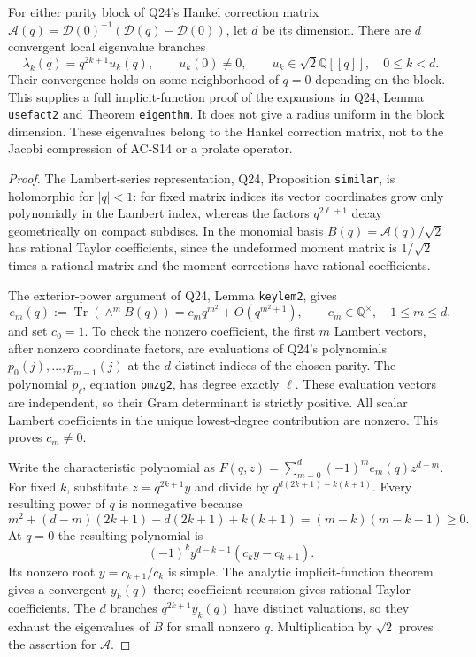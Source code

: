 \begin{proposition}
\label{AC-S20}
For either parity block of Q24's Hankel correction matrix
\(\mathcal A(q)=\mathcal D(0)^{-1}
                         (\mathcal D(q)-\mathcal D(0))\),
let \(d\) be its dimension.  There are \(d\) convergent local
eigenvalue branches
\[
 \lambda_k(q)=q^{2k+1}u_k(q),\qquad
 u_k(0)\ne0,\qquad
 u_k\in\sqrt2\mathbb Q[[q]],\quad0\leq k<d.
\]
Their convergence holds on some neighborhood of \(q=0\) depending
on the block.  This supplies a full implicit-function proof of the
expansions in Q24, Lemma \texttt{usefact2} and Theorem
\texttt{eigenthm}.  It does not give a radius uniform in the block
dimension.  These eigenvalues belong to the Hankel correction matrix,
not to the Jacobi compression of AC-S14 or a prolate operator.
\end{proposition}
\begin{proof}
The Lambert-series representation, Q24, Proposition
\texttt{similar}, is holomorphic for \(|q|<1\): for fixed matrix
indices its vector coordinates grow only polynomially in the
Lambert index, whereas the factors \(q^{2\ell+1}\) decay
geometrically on compact subdiscs.  In the monomial basis
\(B(q)=\mathcal A(q)/\sqrt2\) has rational Taylor coefficients,
since the undeformed moment matrix is \(1/\sqrt2\) times a
rational matrix and the moment corrections have rational
coefficients.

The exterior-power argument of Q24, Lemma \texttt{keylem2}, gives
\[
 e_m(q):=\operatorname{Tr}(\wedge^mB(q))
       =c_mq^{m^2}+O(q^{m^2+1}),\qquad c_m\in\mathbb Q^\times,
       \quad1\leq m\leq d,
\]
and set \(c_0=1\).  To check the nonzero coefficient, the first
\(m\) Lambert vectors, after nonzero coordinate factors, are
evaluations of Q24's polynomials \(p_0(j),\ldots,p_{m-1}(j)\)
at the \(d\) distinct indices of the chosen parity.  The polynomial
\(p_\ell\), equation \texttt{pmzg2}, has degree exactly \(\ell\).
These evaluation vectors are independent, so their Gram determinant
is strictly positive.  All scalar Lambert coefficients in the unique
lowest-degree contribution are nonzero.  This proves \(c_m\ne0\).

Write the characteristic polynomial as
\(F(q,z)=\sum_{m=0}^d(-1)^me_m(q)z^{d-m}\).
For fixed \(k\), substitute \(z=q^{2k+1}y\) and divide by
\(q^{d(2k+1)-k(k+1)}\).  Every resulting power of \(q\) is
nonnegative because
\[
 m^2+(d-m)(2k+1)-d(2k+1)+k(k+1)
       =(m-k)(m-k-1)\geq0.
\]
At \(q=0\) the resulting polynomial is
\[
 (-1)^ky^{d-k-1}(c_ky-c_{k+1}).
\]
Its nonzero root \(y=c_{k+1}/c_k\) is simple.  The analytic
implicit-function theorem gives a convergent \(y_k(q)\) there;
coefficient recursion gives rational Taylor coefficients.  The
\(d\) branches \(q^{2k+1}y_k(q)\) have distinct valuations, so
they exhaust the eigenvalues of \(B\) for small nonzero \(q\).
Multiplication by \(\sqrt2\) proves the assertion for
\(\mathcal A\).
\end{proof}

